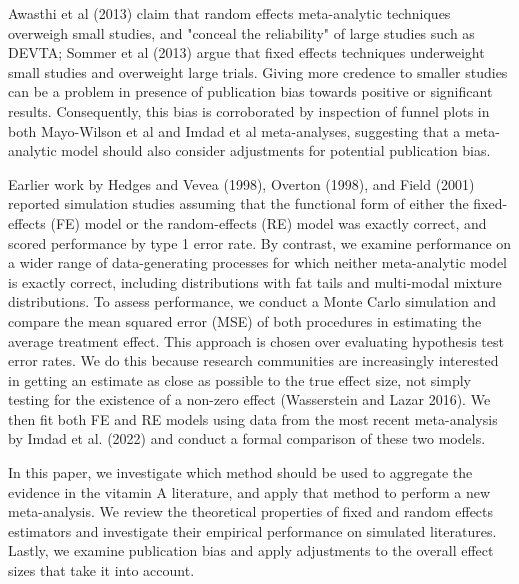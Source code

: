\documentclass[12pt]{article}
\begin{document}
Awasthi et al (2013) claim that random effects meta-analytic techniques overweigh small studies, and "conceal the reliability" of large studies such as DEVTA; Sommer et al (2013) argue that fixed effects techniques underweight small studies and overweight large trials.
Giving more credence to smaller studies can be a problem in presence of publication bias towards positive or significant results. Consequently, this bias is corroborated by inspection of funnel plots in both Mayo-Wilson et al and Imdad et al meta-analyses, suggesting that a meta-analytic model should also consider adjustments for potential publication bias.

Earlier work by Hedges and Vevea (1998), Overton (1998), and Field (2001) reported simulation studies assuming that the functional form of either the fixed-effects (FE) model or the random-effects (RE) model was exactly correct, and scored performance by type 1 error rate. By contrast, we examine performance on a wider range of data-generating processes for which neither meta-analytic model is exactly correct, including distributions with fat tails and multi-modal mixture distributions. To assess performance, we conduct a Monte Carlo simulation and compare the mean squared error (MSE) of both procedures in estimating the average treatment effect. This approach is chosen over evaluating hypothesis test error rates. We do this because research communities are increasingly interested in getting an estimate as close as possible to the true effect size, not simply testing for the existence of a non-zero effect (Wasserstein and Lazar 2016). We then fit both FE and RE models using data from the most recent meta-analysis by Imdad et al. (2022) and conduct a formal comparison of these two models.

In this paper, we investigate which method should be used to aggregate the evidence in the vitamin A literature, and apply that method to perform a new meta-analysis. We review the theoretical properties of fixed and random effects estimators and investigate their empirical performance on simulated literatures. Lastly, we examine publication bias and apply adjustments to the overall effect sizes that take it into account.
\end{document}
